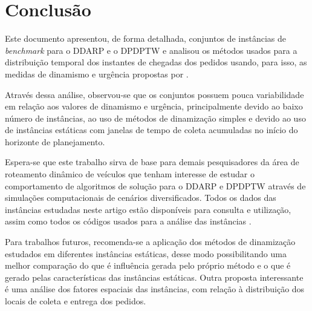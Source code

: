 \chapter{Conclusão}\label{ch:conclusao}


Este documento apresentou, de forma detalhada, conjuntos de instâncias de 
\textit{benchmark} para o DDARP e o DPDPTW e analisou os métodos usados para a 
distribuição temporal dos instantes de chegadas dos pedidos usando, para isso,
as medidas de dinamismo e urgência propostas por 
.

Através dessa análise, observou-se que os conjuntos possuem pouca 
variabilidade em relação aos valores de dinamismo e urgência, principalmente 
devido ao baixo número de instâncias, ao uso de métodos de dinamização simples 
e devido ao uso de instâncias estáticas com janelas de tempo de coleta
acumuladas no início do horizonte de planejamento.

Espera-se que este trabalho sirva de base para demais pesquisadores da área de 
roteamento dinâmico de veículos que tenham interesse de estudar o comportamento
de algoritmos de solução para o DDARP e DPDPTW através de simulações 
computacionais de cenários diversificados.
Todos os dados das instâncias estudadas neste artigo estão disponíveis para 
consulta e utilização, assim como todos os códigos usados para a análise das 
instâncias \cite{eccel_problemas_2019}.

Para trabalhos futuros, recomenda-se a aplicação dos métodos de dinamização
estudados em diferentes instâncias estáticas, desse modo possibilitando uma
melhor comparação do que é influência gerada pelo próprio método e o que é 
gerado pelas características das instâncias estáticas.
Outra proposta interessante é uma análise dos fatores espaciais das 
instâncias, com relação à distribuição dos locais de coleta e entrega dos 
pedidos.
